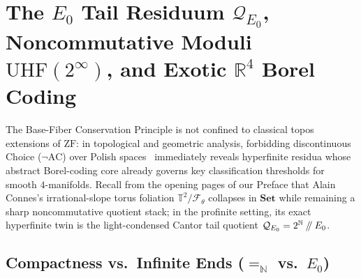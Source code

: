 \documentclass[10pt,twoside,openright]{book}
\theoremstyle{crmplain}
\theoremstyle{crmdef}
\theoremstyle{crmremark}
\providecommand{\sslash}{\mathbin{/\mkern-5mu/}}
\begin{document}
\section{\texorpdfstring{The $E_0$ Tail Residuum $\mathcal{Q}_{E_0}$, Noncommutative Moduli $\mathrm{UHF}(2^\infty)$, and Exotic $\mathbb{R}^4$ Borel Coding}{The E0 Tail Residuum QE0, Noncommutative Moduli UHF(2\^{}infty), and Exotic R4 Borel Coding}}\label{sec:exotic-r4-e0}

The Base-Fiber Conservation Principle is not confined to classical topos extensions of $\mathrm{ZF}$: in topological and geometric analysis, forbidding discontinuous Choice ($\neg\mathrm{AC}$) over Polish spaces~\cite{Kechris95} immediately reveals hyperfinite residua whose abstract Borel-coding core already governs key classification thresholds for smooth $4$-manifolds. Recall from the opening pages of our Preface that Alain Connes's irrational-slope torus foliation $\mathbb{T}^2 / \mathcal{F}_\theta$ collapses in $\mathbf{Set}$ while remaining a sharp noncommutative quotient stack; in the profinite setting, its exact hyperfinite twin is the light-condensed Cantor tail quotient $\mathcal{Q}_{E_0} = 2^{\mathbb{N}} \sslash E_0$.

\subsection{\texorpdfstring{Compactness vs.\ Infinite Ends ($=_{\mathbb{N}}$ vs.\ $E_0$)}{Compactness vs. Infinite Ends (=N vs. E0)}}
\end{document}
